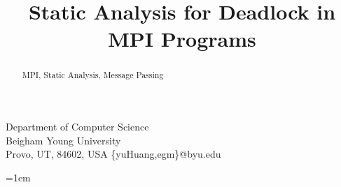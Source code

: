\documentclass[preprint]{sigplanconf}
\begin{document}
\setlength{\pdfpageheight}{\paperheight}
\setlength{\pdfpagewidth}{\paperwidth}


\title{Static Analysis for Deadlock in MPI Programs}


           {Department of Computer Science\\
           Beigham Young University\\
           Provo, UT, 84602, USA}
           {\{yuHuang,egm\}@byu.edu}

\maketitle
%
%
\emergencystretch=1em


\begin{abstract}


\keywords
MPI, Static Analysis, Message Passing

\end{abstract}










%




\newpage


\end{document}
